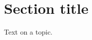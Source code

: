 \documentclass[8pt, onecolumn]{article}
\begin{document}

\section{Section title}
Text on a topic.



%
%
\end{document}
